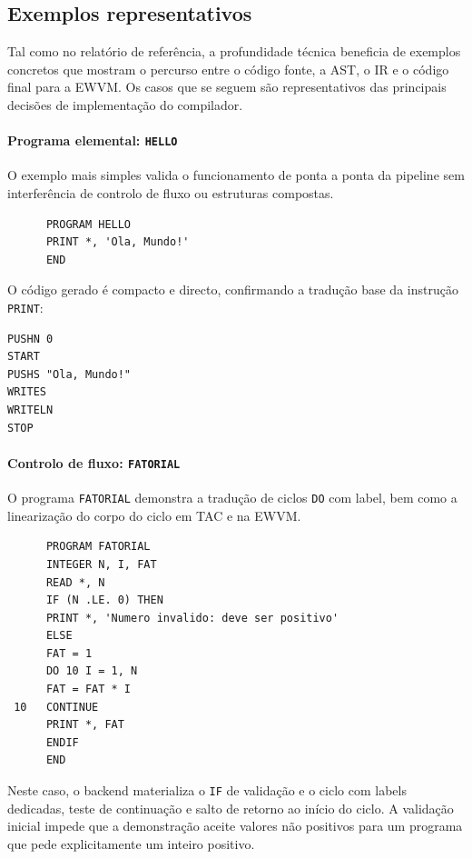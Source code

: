 \documentclass{article}
\begin{document}
\subsection{Exemplos representativos}

Tal como no relatório de referência, a profundidade técnica beneficia de exemplos concretos que
mostram o percurso entre o código fonte, a AST, o IR e o código final para a EWVM. Os casos que
se seguem são representativos das principais decisões de implementação do compilador.

\paragraph{Programa elemental: \texttt{HELLO}}
O exemplo mais simples valida o funcionamento de ponta a ponta da pipeline sem interferência de
controlo de fluxo ou estruturas compostas.

\begin{verbatim}
      PROGRAM HELLO
      PRINT *, 'Ola, Mundo!'
      END
\end{verbatim}

O código gerado é compacto e directo, confirmando a tradução base da instrução \texttt{PRINT}:

\begin{verbatim}
PUSHN 0
START
PUSHS "Ola, Mundo!"
WRITES
WRITELN
STOP
\end{verbatim}

\paragraph{Controlo de fluxo: \texttt{FATORIAL}}
O programa \texttt{FATORIAL} demonstra a tradução de ciclos \texttt{DO} com label, bem como a
linearização do corpo do ciclo em TAC e na EWVM.

\begin{verbatim}
      PROGRAM FATORIAL
      INTEGER N, I, FAT
      READ *, N
      IF (N .LE. 0) THEN
      PRINT *, 'Numero invalido: deve ser positivo'
      ELSE
      FAT = 1
      DO 10 I = 1, N
      FAT = FAT * I
 10   CONTINUE
      PRINT *, FAT
      ENDIF
      END
\end{verbatim}

Neste caso, o backend materializa o \texttt{IF} de validação e o ciclo com labels dedicadas,
teste de continuação e salto de retorno ao início do ciclo. A validação inicial impede que a
demonstração aceite valores não positivos para um programa que pede explicitamente um inteiro
positivo.
\end{document}
